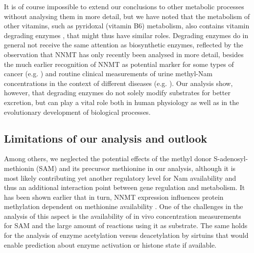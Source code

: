 It is of course impossible to extend our conclusions to other metabolic processes without analysing them in more detail, but we have noted that the metabolism of other vitamins, such as pyridoxal (vitamin B6) metabolism, also contains vitamin degrading enzymes , that might thus have similar roles. Degrading enzymes do in general not receive the same attention as biosynthetic enzymes, reflected by the observation that NNMT has only recently been analysed in more detail, besides the much earlier recognition of NNMT as potential marker for some types of cancer (e.g. \cite{Okamura1998}) and routine clinical measurements of urine methyl-Nam concentrations in the context of different diseases (e.g. \cite{Pumpo2001,Delaney2005}). Our analysis show, however, that degrading enzymes do not solely modify substrates for better excretion, but can play a vital role both in human physiology as well as in the evolutionary development of biological processes.


\subsection{Limitations of our analysis and outlook}

Among others, we neglected the potential effects of the methyl donor S-adenosyl-methionin (SAM) and its precursor methionine in our analysis, although it is most likely contributing yet another regulatory level for Nam availability and thus an additional interaction point between gene regulation and metabolism. It has been shown earlier that in turn, NNMT expression influences protein methylation dependent on methionine availability \cite{Ulanovskaya2013}. One of the challenges in the analysis of this aspect is the availability of in vivo concentration measurements for SAM and the large amount of reactions using it as substrate. The same holds for the analysis of enzyme acetylation versus deacetylation by sirtuins that would enable prediction about enzyme activation or histone state if available.

